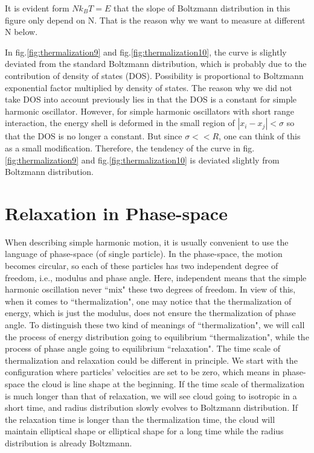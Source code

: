 \documentclass[aps,pre,twocolumn
,groupedaddress]{revtex4-1}
\begin{document}
It is evident form $Nk_BT=E$ that the slope of Boltzmann distribution in this figure only depend on N. That is the reason why we want to measure at different N below. 

In fig.\ref{fig:thermalization9} and fig.\ref{fig:thermalization10}, the curve is slightly deviated from the standard Boltzmann distribution, which is probably due to the contribution of density of states (DOS). Possibility is proportional to Boltzmann exponential factor multiplied by density of states. The reason why we did not take DOS into account previously lies in that the DOS is a constant for simple harmonic oscillator. However, for simple harmonic oscillators with short range interaction, the energy shell is deformed in the small region of $|x_i-x_j|<\sigma$ so that the DOS is no longer a constant. But since $\sigma<<R$, one can think of this as a small modification. Therefore, the tendency of the curve in fig.\ref{fig:thermalization9} and fig.\ref{fig:thermalization10} is deviated slightly from Boltzmann distribution.
 


\section{Relaxation in Phase-space}

When describing simple harmonic motion, it is usually convenient to use the language of phase-space (of single particle). In the phase-space, the motion becomes circular, so each of these particles has two independent degree of freedom, i.e., modulus and phase angle. Here, independent means that the simple harmonic oscillation never ``mix" these two degrees of freedom. In view of this, when it comes to ``thermalization", one may notice that the thermalization of energy, which is just the modulus, does not ensure the thermalization of phase angle. To distinguish these two kind of meanings of ``thermalization", we will call the process of energy distribution going to equilibrium ``thermalization", while the process of phase angle going to equilibrium ``relaxation". The time scale of thermalization and relaxation could be different in principle. We start with the configuration where particles' velocities are set to be zero, which means in phase-space the cloud is line shape at the beginning. If the time scale of thermalization is much longer than that of relaxation, we will see cloud going to isotropic in a short time, and radius distribution slowly evolves to Boltzmann distribution. If the relaxation time is longer than the thermalization time, the cloud will maintain elliptical shape or elliptical shape for a long time while the radius distribution is already Boltzmann.
\end{document}
